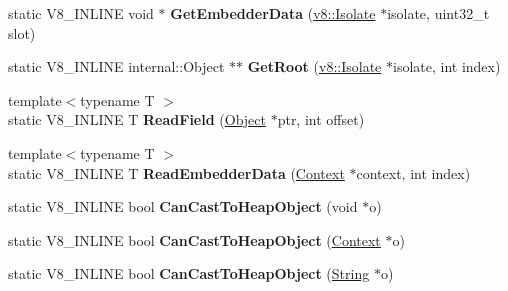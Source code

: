 \begin{DoxyCompactItemize}
\item 
\hypertarget{classv8_1_1internal_1_1_internals_a3b07e7400b6dd5bc64510050011ba17e}{}static V8\+\_\+\+I\+N\+L\+I\+N\+E void $\ast$ {\bfseries Get\+Embedder\+Data} (\hyperlink{classv8_1_1_isolate}{v8\+::\+Isolate} $\ast$isolate, uint32\+\_\+t slot)\label{classv8_1_1internal_1_1_internals_a3b07e7400b6dd5bc64510050011ba17e}

\item 
\hypertarget{classv8_1_1internal_1_1_internals_aae733fd76f6f692f83a6ded4ac8f1571}{}static V8\+\_\+\+I\+N\+L\+I\+N\+E internal\+::\+Object $\ast$$\ast$ {\bfseries Get\+Root} (\hyperlink{classv8_1_1_isolate}{v8\+::\+Isolate} $\ast$isolate, int index)\label{classv8_1_1internal_1_1_internals_aae733fd76f6f692f83a6ded4ac8f1571}

\item 
\hypertarget{classv8_1_1internal_1_1_internals_a4f28cf2b35b038c62b1223c011bae218}{}{\footnotesize template$<$typename T $>$ }\\static V8\+\_\+\+I\+N\+L\+I\+N\+E T {\bfseries Read\+Field} (\hyperlink{classv8_1_1_object}{Object} $\ast$ptr, int offset)\label{classv8_1_1internal_1_1_internals_a4f28cf2b35b038c62b1223c011bae218}

\item 
\hypertarget{classv8_1_1internal_1_1_internals_a2e39d109347580ac762eb0eceeb75687}{}{\footnotesize template$<$typename T $>$ }\\static V8\+\_\+\+I\+N\+L\+I\+N\+E T {\bfseries Read\+Embedder\+Data} (\hyperlink{classv8_1_1_context}{Context} $\ast$context, int index)\label{classv8_1_1internal_1_1_internals_a2e39d109347580ac762eb0eceeb75687}

\item 
\hypertarget{classv8_1_1internal_1_1_internals_a3b15ad34f41f6db55d5a64a3f798a593}{}static V8\+\_\+\+I\+N\+L\+I\+N\+E bool {\bfseries Can\+Cast\+To\+Heap\+Object} (void $\ast$o)\label{classv8_1_1internal_1_1_internals_a3b15ad34f41f6db55d5a64a3f798a593}

\item 
\hypertarget{classv8_1_1internal_1_1_internals_a33864a5a7cde29ca8c6ddf32aff45a78}{}static V8\+\_\+\+I\+N\+L\+I\+N\+E bool {\bfseries Can\+Cast\+To\+Heap\+Object} (\hyperlink{classv8_1_1_context}{Context} $\ast$o)\label{classv8_1_1internal_1_1_internals_a33864a5a7cde29ca8c6ddf32aff45a78}

\item 
\hypertarget{classv8_1_1internal_1_1_internals_a893e76f30f934b44615fb428c8a1532d}{}static V8\+\_\+\+I\+N\+L\+I\+N\+E bool {\bfseries Can\+Cast\+To\+Heap\+Object} (\hyperlink{classv8_1_1_string}{String} $\ast$o)\label{classv8_1_1internal_1_1_internals_a893e76f30f934b44615fb428c8a1532d}


\end{DoxyCompactItemize}
